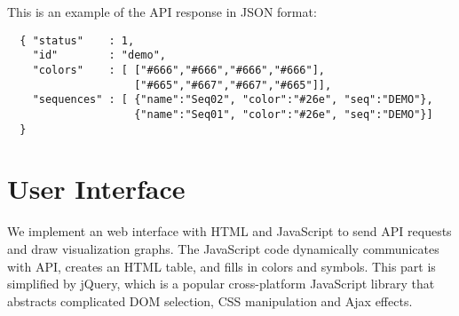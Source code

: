 This is an example of the API response in JSON format:
\def\baselinestretch{1}
\begin{verbatim}
  { "status"    : 1,
    "id"        : "demo",
    "colors"    : [ ["#666","#666","#666","#666"],
                    ["#665","#667","#667","#665"]],
    "sequences" : [ {"name":"Seq02", "color":"#26e", "seq":"DEMO"},
                    {"name":"Seq01", "color":"#26e", "seq":"DEMO"}]
  }
\end{verbatim}

\section{User Interface}

We implement an web interface with HTML and JavaScript to send API requests and draw visualization graphs. The JavaScript code dynamically communicates with API, creates an HTML table, and fills in colors and symbols. This part is simplified by jQuery, which is a popular cross-platform JavaScript library that abstracts complicated DOM selection, CSS manipulation and Ajax effects.
